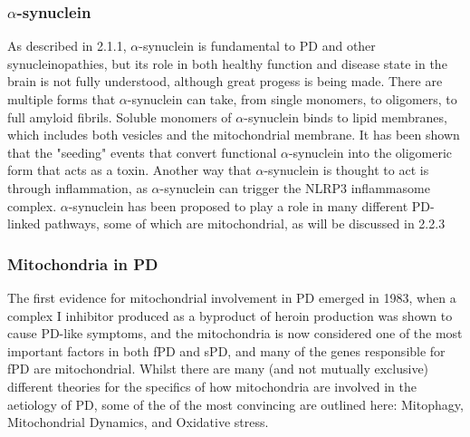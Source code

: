 \documentclass{article}
\begin{document}
\subsubsection{$\alpha$-synuclein}
As described in 2.1.1, $\alpha$-synuclein is fundamental to PD and other synucleinopathies, but its role in both healthy function and disease state in the brain is not fully understood, although great progess is being made. There are multiple forms that $\alpha$-synuclein can take, from single monomers, to oligomers, to full amyloid fibrils\cite{Mehra2019-SynucleinPathogenesis}. Soluble monomers of $\alpha$-synuclein binds to lipid membranes, which includes both vesicles and the mitochondrial membrane\cite{Burre2018Cell-Synuclein}. It has been shown that the "seeding" events that convert functional $\alpha$-synuclein into the oligomeric form that acts as a toxin\cite{Choi2022PathologicalToxicity}.
Another way that $\alpha$-synuclein is thought to act is through inflammation, as $\alpha$-synuclein can trigger the NLRP3 inflammasome complex\cite{Forloni2023AlphaInflammation}. $\alpha$-synuclein has been proposed to play a role in many different PD-linked pathways, some of which are mitochondrial, as will be discussed in 2.2.3
\subsubsection{Mitochondria in PD}
The first evidence for mitochondrial involvement in PD emerged in 1983, when a complex I inhibitor produced as a byproduct of heroin production was shown to cause PD-like symptoms\cite{Langston1983ChronicSynthesis}, and the mitochondria is now considered one of the most important factors in both fPD and sPD\cite{Henrich2023MitochondrialPotential}, and many of the genes responsible for fPD are mitochondrial. Whilst there are many (and not mutually exclusive) different theories for the specifics of how mitochondria are involved in the aetiology of PD, some of the of the most convincing are outlined here: Mitophagy, Mitochondrial Dynamics, and Oxidative stress.
\end{document}
